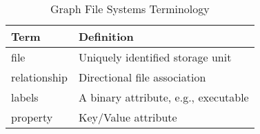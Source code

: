 
\begin{table}[h]
    \captionsetup{justification=centering}
    \begin{tabular}{p{2cm}p{5cm}}
        Term                          & Definition\tabularnewline\hline
        \multirow{1}{*}{file}         &
        \multirow{1}{*}{\parbox{4.8cm}{Uniquely identified storage unit}}
        \tabularnewline
        \multirow{1}{*}{relationship} &
        \multirow{1}{*}{\parbox{4.8cm}{Directional file association}}
        \tabularnewline
        \multirow{1}{*}{labels}       &
        \multirow{1}{*}{\parbox{4.8cm}{A binary attribute, e.g., executable}}
        \tabularnewline
        \multirow{1}{*}{property}     &
        \multirow{1}{*}{\parbox{4.8cm}{Key/Value attribute}}
        \tabularnewline
    \end{tabular}
    \caption{Graph File Systems Terminology}\label{hotos19:table:graphfs:terminology}
\end{table}

